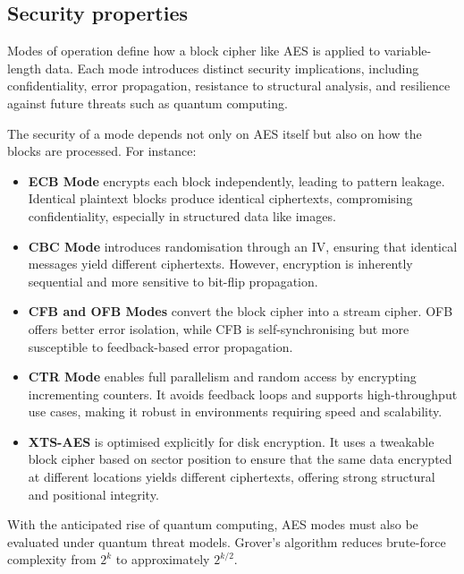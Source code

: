 \subsection{Security properties}

Modes of operation define how a block cipher like AES is applied to variable-length data. 
Each mode introduces distinct security implications, 
including confidentiality, error propagation, resistance to structural analysis, 
and resilience against future threats such as quantum computing.

\noindent The security of a mode depends not only on AES itself but also on how the blocks are processed. 
For instance:

\begin{itemize}
    \item \textbf{\Gls{ECB} Mode} encrypts each block independently, leading to pattern leakage. Identical plaintext blocks produce identical ciphertexts, compromising confidentiality, especially in structured data like images.
    
    \item \textbf{\Gls{CBC} Mode} introduces randomisation through an \Gls{IV}, ensuring that identical messages yield different ciphertexts. However, encryption is inherently sequential and more sensitive to bit-flip propagation.
    
    \item \textbf{\Gls{CFB} and \Gls{OFB} Modes} convert the block cipher into a stream cipher. OFB offers better error isolation, while CFB is self-synchronising but more susceptible to feedback-based error propagation.
    
    \item \textbf{\Gls{CTR} Mode} enables full parallelism and random access by encrypting incrementing counters. It avoids feedback loops and supports high-throughput use cases, making it robust in environments requiring speed and scalability.
    
    \item \textbf{\Gls{XTS}-AES} is optimised explicitly for disk encryption. It uses a tweakable block cipher based on sector position to ensure that the same data encrypted at different locations yields different ciphertexts, offering strong structural and positional integrity.
\end{itemize}

With the anticipated rise of quantum computing, 
AES modes must also be evaluated under quantum threat models. 
Grover’s algorithm reduces brute-force complexity from $2^k$ to approximately $2^{k/2}$. \newline

